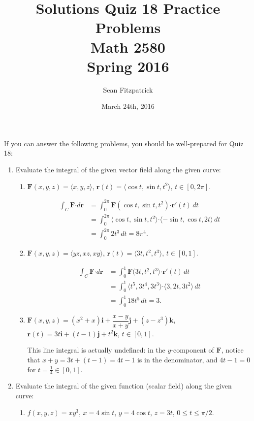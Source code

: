 \documentclass[letterpaper,12pt]{article}
\title{Solutions Quiz 18 Practice Problems\\Math 2580\\Spring 2016}
\author{Sean Fitzpatrick}
\date{March 24th, 2016}
\renewcommand{\i}{\mathbf{i}}
\renewcommand{\j}{\mathbf{j}}
\renewcommand{\k}{\mathbf{k}}
\renewcommand{\r}{\mathbf{r}}
\newcommand{\dotp}{\boldsymbol{\cdot}}
\newcommand{\F}{\mathbf{F}}
\begin{document}
 \maketitle

If you can answer the following problems, you should be well-prepared for Quiz 18:



\begin{enumerate}
 \item Evaluate the integral of the given vector field along the given curve:
\begin{enumerate}
 \item $\F(x,y,z) = \langle x, y, z\rangle$, $\r(t) = \langle \cos t, \sin t, t^2\rangle$, $t\in [0,2\pi]$.

\bigskip

\begin{align*}
 \int_C \F\dotp d\r & = \int_0^{2\pi} \F(\cos t, \sin t, t^2)\dotp \r'(t)\,dt\\
& = \int_0^{2\pi}\langle \cos t, \sin t, t^2\rangle \dotp \langle -\sin t, \cos t, 2t\rangle\,dt\\
& = \int_0^{2\pi} 2t^3\,dt = 8\pi^4.
\end{align*}

 \item $\F(x,y,z) = \langle yz, xz, xy\rangle$, $\r(t) = \langle 3t, t^2, t^3\rangle$, $t\in [0,1]$.

\bigskip

\begin{align*}
 \int_C\F\dotp d\r & = \int_0^1 \F(3t, t^2, t^3\rangle\dotp \r'(t)\,dt\\
& = \int_0^1 \langle t^5, 3t^4, 3t^3\rangle\dotp\langle 3, 2t, 3t^2\rangle\,dt\\
& = \int_0^1 18t^5\,dt = 3.
\end{align*}

 \item $\F(x,y,z) = (x^2+x)\i+\dfrac{x-y}{x+y}\j+(z-z^3)\k$, $\r(t) = 3t\i+(t-1)\j+t^2\k$, $t\in [0,1]$.

\bigskip

This line integral is actually undefined: in the $y$-component of $\F$, notice that $x+y=3t+(t-1) = 4t-1$ is in the denominator, and $4t-1=0$ for $t=\frac{1}{4}\in [0,1]$.

\end{enumerate}
 \item Evaluate the integral of the given function (scalar field) along the given curve:
\begin{enumerate}
 \item $f(x,y,z)=xy^3$, $x=4\sin t$, $y= 4\cos t$, $z=3t$, $0\leq t\leq \pi/2$.


\end{enumerate}
\end{enumerate}
\end{document}
